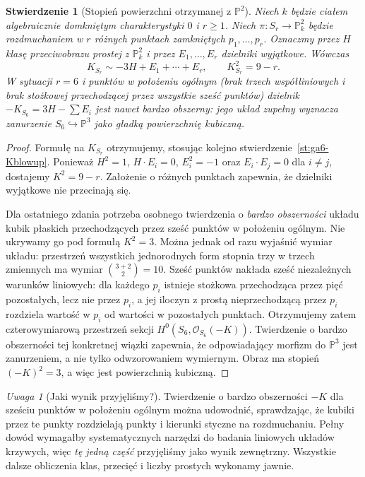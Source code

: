\documentclass[11pt,a4paper,openany]{report}
\numberwithin{equation}{section}
\theoremstyle{plain}
\newtheorem{stwierdzenie}[twierdzenie]{Stwierdzenie}
\theoremstyle{definition}
\theoremstyle{remark}
\newtheorem{uwaga}[twierdzenie]{Uwaga}
\newcommand{\PP}{\mathbb P}
\begin{document}
\begin{stwierdzenie}[Stopień powierzchni otrzymanej z $\PP^2$]
\label{st:ga6-del-pezzo-degree}
Niech $k$ będzie ciałem algebraicznie domkniętym
charakterystyki $0$ i $r\ge1$. Niech
$\pi:S_r\to\PP^2_k$ będzie rozdmuchaniem w $r$
\emph{różnych punktach zamkniętych}
$p_1,\ldots,p_r$. Oznaczmy przez $H$ klasę
przeciwobrazu prostej z $\PP^2_k$ i przez
$E_1,\ldots,E_r$ dzielniki wyjątkowe. Wówczas
\[
 K_{S_r}\sim-3H+E_1+\cdots+E_r,
 \qquad K_{S_r}^2=9-r.
\]
W sytuacji $r=6$ i punktów w położeniu ogólnym
(brak trzech współliniowych i brak stożkowej
przechodzącej przez wszystkie sześć punktów)
dzielnik $-K_{S_6}=3H-\sum E_i$ jest nawet
\emph{bardzo obszerny}: jego układ zupełny
wyznacza zanurzenie $S_6\hookrightarrow\PP^3$
jako gładką powierzchnię kubiczną.
\end{stwierdzenie}
\begin{proof}
Formułę na $K_{S_r}$ otrzymujemy, stosując kolejno
stwierdzenie~\ref{st:ga6-Kblowup}. Ponieważ
$H^2=1$, $H\cdot E_i=0$, $E_i^2=-1$
oraz $E_i\cdot E_j=0$ dla $i\ne j$, dostajemy
$K^2=9-r$. Założenie o różnych punktach zapewnia,
że dzielniki wyjątkowe nie przecinają się.

Dla ostatniego zdania potrzeba osobnego twierdzenia
o \emph{bardzo obszerności} układu kubik
płaskich przechodzących przez sześć punktów
w położeniu ogólnym. Nie ukrywamy go pod formułą
$K^2=3$. Można jednak od razu wyjaśnić wymiar
układu: przestrzeń wszystkich jednorodnych form
stopnia trzy w trzech zmiennych ma wymiar
$\binom{3+2}{2}=10$. Sześć punktów nakłada
sześć niezależnych warunków liniowych: dla każdego
$p_i$ istnieje stożkowa przechodząca przez pięć
pozostałych, lecz nie przez $p_i$, a jej iloczyn
z prostą nieprzechodzącą przez $p_i$ rozdziela
wartość w $p_i$ od wartości w pozostałych punktach.
Otrzymujemy zatem czterowymiarową przestrzeń
sekcji $H^0(S_6,\mathcal O_{S_6}(-K))$.
Twierdzenie o bardzo obszerności tej konkretnej
wiązki zapewnia, że odpowiadający morfizm do
$\PP^3$ jest zanurzeniem, a nie tylko odwzorowaniem
wymiernym. Obraz ma stopień
$(-K)^2=3$, a więc jest powierzchnią kubiczną.
\end{proof}

\begin{uwaga}[Jaki wynik przyjęliśmy?]
Twierdzenie o bardzo obszerności $-K$ dla
sześciu punktów w położeniu ogólnym można udowodnić,
sprawdzając, że kubiki przez te punkty rozdzielają
punkty i kierunki styczne na rozdmuchaniu.
Pełny dowód wymagałby systematycznych narzędzi
do badania liniowych układów krzywych, więc
\emph{tę jedną część} przyjęliśmy jako wynik
zewnętrzny. Wszystkie dalsze obliczenia klas,
przecięć i liczby prostych wykonamy jawnie.
\end{uwaga}
\end{document}
